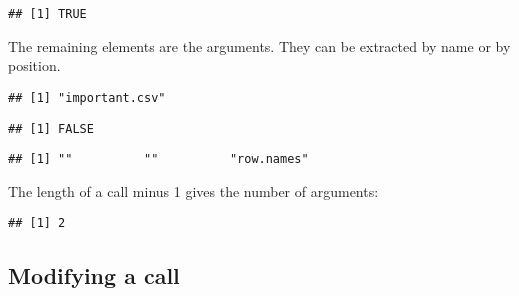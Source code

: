 \begin{verbatim}
## [1] TRUE
\end{verbatim}

The remaining elements are the arguments. They can be extracted by name
or by position.

\begin{Shaded}
\begin{Highlighting}[]
\StringTok{ }\NormalTok{(}\NormalTok{(}\NormalTok{, } \NormalTok{))}
\NormalTok{x[[}\NormalTok{]]}
\end{Highlighting}
\end{Shaded}

\begin{verbatim}
## [1] "important.csv"
\end{verbatim}

\begin{Shaded}
\begin{Highlighting}[]
\OperatorTok{$}
\end{Highlighting}
\end{Shaded}

\begin{verbatim}
## [1] FALSE
\end{verbatim}

\begin{Shaded}
\begin{Highlighting}[]
\end{Highlighting}
\end{Shaded}

\begin{verbatim}
## [1] ""          ""          "row.names"
\end{verbatim}

The length of a call minus 1 gives the number of arguments:

\begin{Shaded}
\begin{Highlighting}[]
\OperatorTok{-}\StringTok{ }
\end{Highlighting}
\end{Shaded}

\begin{verbatim}
## [1] 2
\end{verbatim}

\hypertarget{modifying-a-call}{%
\subsection{Modifying a call}\label{modifying-a-call}}

